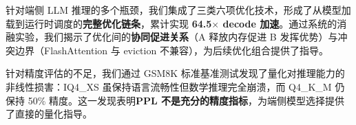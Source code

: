 针对端侧 LLM 推理的多个瓶颈，我们集成了三类六项优化技术，形成了从模型加载到运行时调度的\textbf{完整优化链条}，累计实现 \textbf{64.5$\times$ decode 加速}。通过系统的消融实验，我们揭示了优化间的\textbf{协同促进关系}（A 释放内存促进 B 发挥优势）与冲突边界（FlashAttention 与 eviction 不兼容），为后续优化组合提供了指导。

针对精度评估的不足，我们通过 GSM8K 标准基准测试发现了量化对推理能力的非线性损害：IQ4\_XS 虽保持语言流畅性但数学推理完全崩溃，而 Q4\_K\_M 仍保持 50\% 精度。这一发现表明\textbf{PPL 不是充分的精度指标}，为端侧模型选择提供了直接的量化指导。
